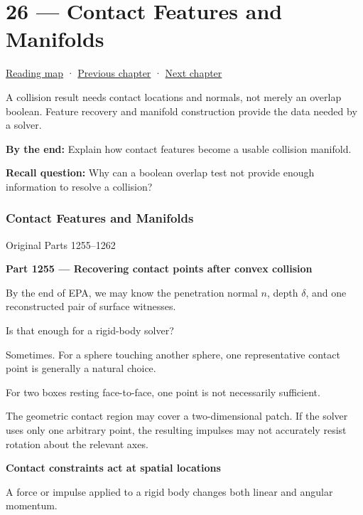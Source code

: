 \hypertarget{04-visual-computing-ii-ch026}{}
\chapter{26 --- Contact Features and Manifolds}\label{04-visual-computing-ii-ch026-contact-features-and-manifolds}

\hyperref[volume-reading-map]{Reading map} · \hyperref[04-visual-computing-ii-ch025-sat-for-triangle-and-convex-polygon-tests]{Previous chapter} · \hyperref[04-visual-computing-ii-ch027-mesh-queries-classification-and-clipping]{Next chapter}

A collision result needs contact locations and normals, not merely an overlap boolean. Feature recovery and manifold construction provide the data needed by a solver.

\textbf{By the end:} Explain how contact features become a usable collision manifold.

\textbf{Recall question:} Why can a boolean overlap test not provide enough information to resolve a collision?

\subsection{Contact Features and Manifolds}\label{04-visual-computing-ii-ch026-contact-features-and-manifolds-1}

Original Parts 1255--1262

\textbf{Part 1255 --- Recovering contact points after convex collision}

By the end of EPA, we may know the penetration normal \(n\), depth \(\delta\), and one reconstructed pair of surface witnesses.

Is that enough for a rigid-body solver?

Sometimes. For a sphere touching another sphere, one representative contact point is generally a natural choice.

For two boxes resting face-to-face, one point is not necessarily sufficient.

The geometric contact region may cover a two-dimensional patch. If the solver uses only one arbitrary point, the resulting impulses may not accurately resist rotation about the relevant axes.

\textbf{Contact constraints act at spatial locations}

A force or impulse applied to a rigid body changes both linear and angular momentum.

